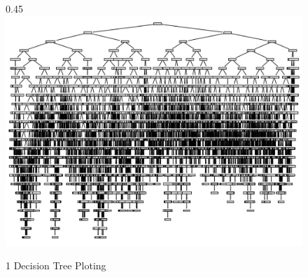 \begin{figure}[h!]{0.45\textwidth}
        \centering
        \includegraphics[width=\textwidth]{00000.jpg}
        \caption{1 Decision Tree Ploting }
        \label{fig:another2}
\end{figure}
\newpage
